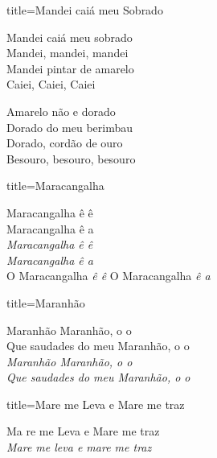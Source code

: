 \documentclass[fontsize=14pt, paper=a4, twoside, DIV=20]{scrreprt} %
\begin{document}
\begin{multicols*}{2}
\begin{song}{title={Mandei caiá meu Sobrado}}
    \begin{verse*}
            Mandei caiá meu sobrado \\
            Mandei, mandei, mandei\\
            Mandei pintar de amarelo\\
            Caiei, Caiei, Caiei\\
    \end{verse*}
     \begin{verse*}
            Amarelo não e dorado \\
            Dorado do meu berimbau\\
            Dorado, cordão de ouro\\
            Besouro, besouro, besouro\\
    \end{verse*}


\end{song}

\begin{song}{title={Maracangalha}}
    \begin{verse*}
        Maracangalha ê ê \\
        Maracangalha ê a \\
        \textit{Maracangalha ê ê \\
        Maracangalha ê a \\}
        O Maracangalha
        \textit{ê ê}
        O Maracangalha
        \textit{ê a}



    \end{verse*}
\end{song}
\begin{song}{title={Maranhão}}
    \begin{verse*}
        Maranhão Maranhão, o o \\
        Que saudades do meu Maranhão, o o \\
        \textit{Maranhão Maranhão, o o \\
        Que saudades do meu Maranhão, o o \\}
    \end{verse*}
\end{song}

\begin{song}{title={Mare me Leva e Mare me traz}}
        \begin{verse*}
            Ma re me Leva e Mare me traz\\
            \textit{Mare me leva e mare me traz}\\
        \end{verse*}
\end{song}


\end{multicols*}
\end{document}

